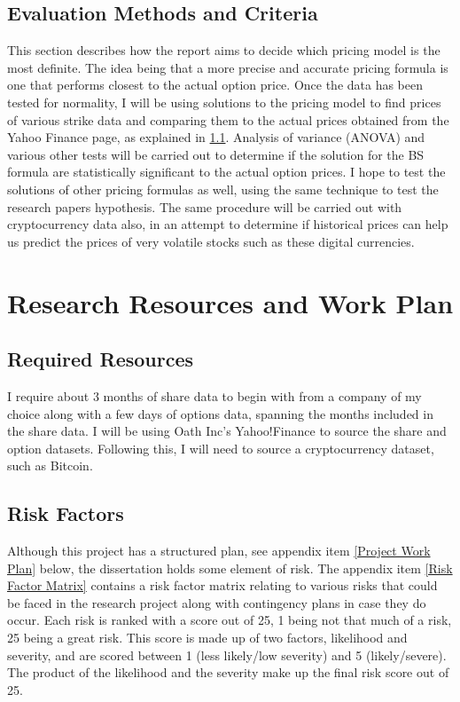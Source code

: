 \documentclass[12pt]{article}
\begin{document}
\subsection{Evaluation Methods and Criteria}
This section describes how the report aims to decide which pricing model is the most definite. The idea being that a more precise and accurate pricing formula is one that performs closest to the actual option price. Once the data has been tested for normality, I will be using solutions to the \cite{BSReport} pricing model to find prices of various strike data and comparing them to the actual prices obtained from the Yahoo Finance page, as explained in \ref{Required Resources}. Analysis of variance (ANOVA) and various other tests will be carried out to determine if the solution for the BS formula are statistically significant to the actual option prices. I hope to test the solutions of other pricing formulas as well, using the same technique to test the research papers hypothesis. The same procedure will be carried out with cryptocurrency data also, in an attempt to determine if historical prices can help us predict the prices of very volatile stocks such as these digital currencies.

\section{Research Resources and Work Plan}

\subsection{Required Resources} \label{Required Resources}
I require about 3 months of share data to begin with from a company of my choice along with a few days of options data, spanning the months included in the share data. I will be using Oath Inc's Yahoo!Finance to source the share and option datasets. Following this, I will need to source a cryptocurrency dataset, such as Bitcoin.

\subsection{Risk Factors}
Although this project has a structured plan, see appendix item \ref{Project Work Plan} below, the dissertation holds some element of risk. The appendix item \ref{Risk Factor Matrix} contains a risk factor matrix relating to various risks that could be faced in the research project along with contingency plans in case they do occur. Each risk is ranked with a score out of 25, 1 being not that much of a risk, 25 being a great risk. This score is made up of two factors, likelihood and severity, and are scored between 1 (less likely/low severity) and 5 (likely/severe). The product of the likelihood and the severity make up the final risk score out of 25.
\end{document}
